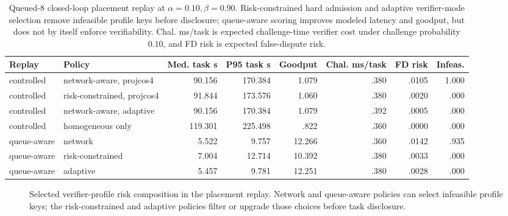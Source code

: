 \documentclass[sigplan,screen,review,anonymous]{acmart}
\newcommand{\suppRiskCompositionWidth}{0.9\linewidth}
\begin{document}
\begin{table}[t]
\centering
\scriptsize
\setlength{\tabcolsep}{3.4pt}
\caption{Queued-8 closed-loop placement replay at
\(\alpha=0.10,\beta=0.90\). Risk-constrained hard admission and adaptive
verifier-mode selection remove infeasible profile keys before disclosure;
queue-aware scoring improves modeled latency and goodput, but does not by
itself enforce verifiability. Chal. ms/task is expected challenge-time verifier
cost under challenge probability \(0.10\), and FD risk is expected
false-dispute risk.}
\label{tab:app-placement-policy-exact}
\begin{tabular}{llrrrrrr}
\toprule
Replay & Policy & Med. task s & P95 task s & Goodput & Chal. ms/task & FD risk & Infeas. \\
\midrule
controlled & network-aware, projcos4 & 90.156 & 170.384 & 1.079 & .380 & .0105 & 1.000 \\
controlled & risk-constrained, projcos4 & 91.844 & 173.576 & 1.060 & .380 & .0020 & .000 \\
controlled & network-aware, adaptive & 90.156 & 170.384 & 1.079 & .392 & .0005 & .000 \\
controlled & homogeneous only & 119.301 & 225.498 & .822 & .360 & .0000 & .000 \\
\midrule
queue-aware & network & 5.522 & 9.757 & 12.266 & .360 & .0142 & .935 \\
queue-aware & risk-constrained & 7.004 & 12.714 & 10.392 & .380 & .0033 & .000 \\
queue-aware & adaptive & 5.457 & 9.781 & 12.251 & .380 & .0028 & .000 \\
\bottomrule
\end{tabular}
\end{table}

\begin{figure}[t]
\centering
\resizebox{\suppRiskCompositionWidth}{!}{}
\caption{Selected verifier-profile risk composition in the placement replay.
Network and queue-aware policies can select infeasible profile keys; the
risk-constrained and adaptive policies filter or upgrade those choices before
task disclosure.}
\label{fig:app-risk-composition}
\end{figure}
\end{document}
